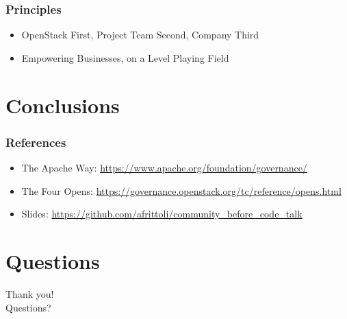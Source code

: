 \documentclass[aspectratio=169,11pt,hyperref={colorlinks=true}]{beamer}
\begin{document}
\begin{frame}
  \frametitle{Principles}
    \begin{itemize}
        \item{OpenStack First, Project Team Second, Company Third}
        \item{Empowering Businesses, on a Level Playing Field}
    \end{itemize}
\end{frame}

\section{Conclusions}

\begin{frame}
  \frametitle{References}
  \begin{itemize}
      \item{The Apache Way: \href{https://www.apache.org/foundation/governance/}{https://www.apache.org/foundation/governance/}}
      \item{The Four Opens: \href{https://governance.openstack.org/tc/reference/opens.html}{https://governance.openstack.org/tc/reference/opens.html}}
      \item{Slides: \href{https://github.com/afrittoli/community\_before\_code\_talk}{https://github.com/afrittoli/community\_before\_code\_talk}}
  \end{itemize}
\end{frame}

\section{Questions}
\begin{frame}[c]
    \begin{center}
        \Huge Thank you!\\Questions?
    \end{center}
\end{frame}
\end{document}
